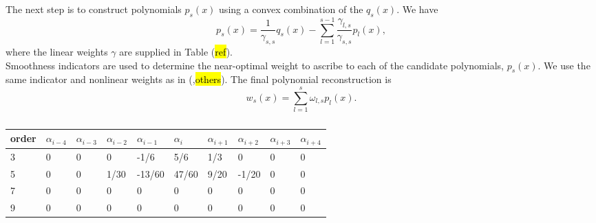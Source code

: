 \documentclass[]{article}
\begin{document}
        The next step is to construct polynomials $p_{s}(x)$ using a convex
        combination of the $q_{s}(x)$. We have
        \begin{equation}
            p_{s}(x) = \frac{1}{\gamma_{s,s}} q_{s}(x) - \sum_{l=1}^{s-1}
            \frac{\gamma_{l,s}}{\gamma_{s,s}} p_{l}(x),
        \end{equation}
        where the linear weights $\gamma$ are supplied in Table (\hl{ref}). \\

        Smoothness indicators are used to determine the near-optimal weight to
        ascribe to each of the candidate polynomials, $p_{s}(x)$. We use the
        same indicator and nonlinear weights as in (\cite{zhu2018},\hl{others}).
        The final polynomial reconstruction is 
        \begin{equation}
            w_{s}(x) = \sum_{l=1}^{s} \omega_{l,s} p_{l}(x).
        \end{equation}
 
        \begin{table}[H]
            \center
            \begin{tabular}{|l|l|l|l|l|l|l|l|l|l|}
            \hline
                order & $\alpha_{i-4}$ & $\alpha_{i-3}$ & $\alpha_{i-2}$ &
                $\alpha_{i-1}$ & $\alpha_{i}$ & $\alpha_{i+1}$ & $\alpha_{i+2}$
                & $\alpha_{i+3}$ & $\alpha_{i+4}$ \\ \hline
                3 & 0 & 0 & 0 & -1/6 & 5/6 & 1/3 & 0 & 0 & 0 \\ \hline
                5 & 0 & 0 & 1/30 & -13/60 & 47/60 & 9/20 & -1/20 & 0 & 0 \\ \hline
                7 & 0 & 0 & 0 & 0 & 0 & 0 & 0 & 0 & 0 \\ \hline
                9 & 0 & 0 & 0 & 0 & 0 & 0 & 0 & 0 & 0 \\ \hline
            \end{tabular}
            \label{coeff3}
            \caption{}
        \end{table}
\end{document}
